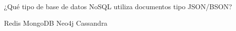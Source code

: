 \question[1] ¿Qué tipo de base de datos NoSQL utiliza documentos tipo JSON/BSON?
\begin{choices}
\choice Redis
\CorrectChoice MongoDB
\choice Neo4j
\choice Cassandra
\end{choices}